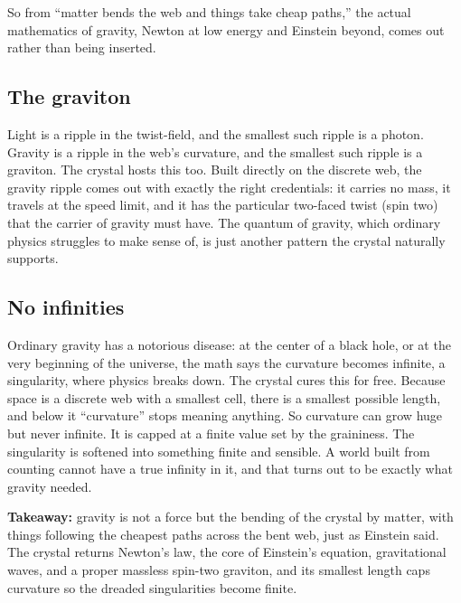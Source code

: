 So from ``matter bends the web and things take cheap paths,'' the actual mathematics of gravity, Newton at low energy and Einstein beyond, comes out rather than being inserted.

\subsection{The graviton}

Light is a ripple in the twist-field, and the smallest such ripple is a photon. Gravity is a ripple in the web's curvature, and the smallest such ripple is a graviton. The crystal hosts this too. Built directly on the discrete web, the gravity ripple comes out with exactly the right credentials: it carries no mass, it travels at the speed limit, and it has the particular two-faced twist (spin two) that the carrier of gravity must have. The quantum of gravity, which ordinary physics struggles to make sense of, is just another pattern the crystal naturally supports.

\subsection{No infinities}

Ordinary gravity has a notorious disease: at the center of a black hole, or at the very beginning of the universe, the math says the curvature becomes infinite, a singularity, where physics breaks down. The crystal cures this for free. Because space is a discrete web with a smallest cell, there is a smallest possible length, and below it ``curvature'' stops meaning anything. So curvature can grow huge but never infinite. It is capped at a finite value set by the graininess. The singularity is softened into something finite and sensible. A world built from counting cannot have a true infinity in it, and that turns out to be exactly what gravity needed.

\textbf{Takeaway:} gravity is not a force but the bending of the crystal by matter, with things following the cheapest paths across the bent web, just as Einstein said. The crystal returns Newton's law, the core of Einstein's equation, gravitational waves, and a proper massless spin-two graviton, and its smallest length caps curvature so the dreaded singularities become finite.
